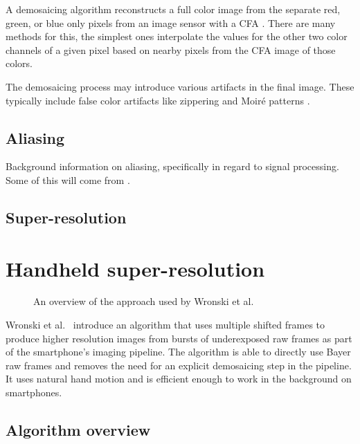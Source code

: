 \documentclass{sig-alternate}
\begin{document}
A demosaicing algorithm reconstructs a full color image from the separate red, green, or blue only pixels from an image sensor with a CFA \cite{wiki:Demosaicing}. There are many methods for this, the simplest ones interpolate the values for the other two color channels of a given pixel based on nearby pixels from the CFA image of those colors.

The demosaicing process may introduce various artifacts in the final image. These typically include false color artifacts like zippering and Moiré patterns \cite{Wronski2019}.

\subsection{Aliasing}

Background information on aliasing, specifically in regard to signal processing. Some of this will come from \cite{wiki:Aliasing}.

\subsection{Super-resolution}

\section{Handheld super-resolution}

\begin{figure*}[t!]
\centering
\caption{An overview of the approach used by Wronski et al. \cite{Wronski2019}}
\label{fig:Wronski2019Fig2}
\end{figure*}

Wronski et al.~\cite{Wronski2019} introduce an algorithm that uses multiple shifted frames to produce higher resolution images from bursts of underexposed raw frames as part of the smartphone's imaging pipeline. The algorithm is able to directly use Bayer raw frames and removes the need for an explicit demosaicing step in the pipeline. It uses natural hand motion and is efficient enough to work in the background on smartphones.

\subsection{Algorithm overview}
\end{document}
